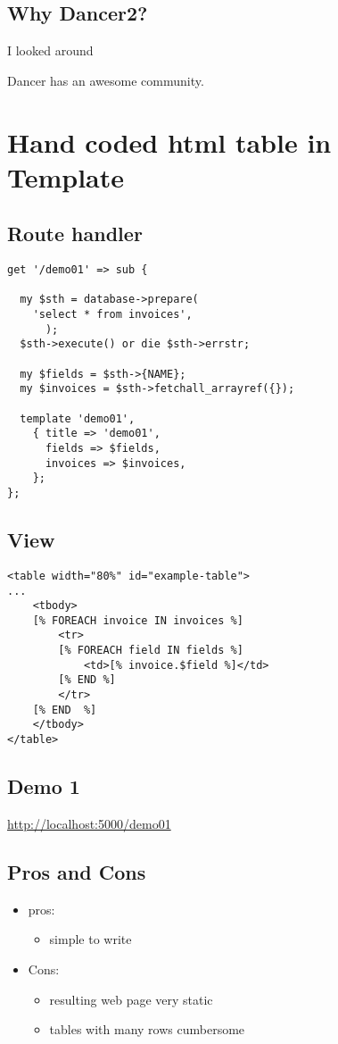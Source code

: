 \documentclass[11pt]{article}
\begin{document}
\subsection*{Why Dancer2?}
\label{sec:orgheadline4}

I looked around 

Dancer has an awesome community.

\section*{Hand coded html table in Template}
\label{sec:orgheadline10}
\subsection*{Route handler}
\label{sec:orgheadline6}
\begin{verbatim}
get '/demo01' => sub {

  my $sth = database->prepare(
	'select * from invoices',
      );
  $sth->execute() or die $sth->errstr;

  my $fields = $sth->{NAME};
  my $invoices = $sth->fetchall_arrayref({});

  template 'demo01',
    { title => 'demo01',
      fields => $fields,
      invoices => $invoices,
    };
};
\end{verbatim}
\subsection*{View}
\label{sec:orgheadline7}
\begin{verbatim}
<table width="80%" id="example-table">
...
    <tbody>
	[% FOREACH invoice IN invoices %]
	    <tr>
		[% FOREACH field IN fields %]
		    <td>[% invoice.$field %]</td>
		[% END %]
	    </tr>
	[% END  %]
    </tbody>
</table>
\end{verbatim}
\subsection*{Demo 1}
\label{sec:orgheadline8}
\url{http://localhost:5000/demo01}
\subsection*{Pros and Cons}
\label{sec:orgheadline9}
\begin{itemize}
\item pros:
\begin{itemize}
\item simple to write
\end{itemize}
\item Cons:
\begin{itemize}
\item resulting web page very static
\item tables with many rows cumbersome
\end{itemize}
\end{itemize}
\end{document}
